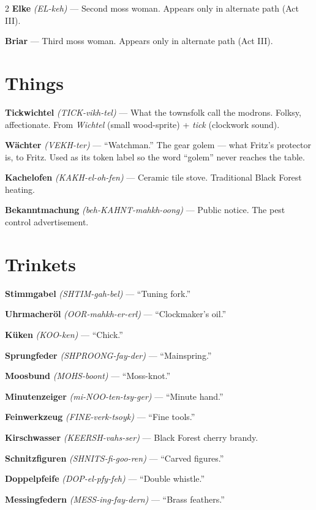 \documentclass[10pt,letterpaper]{article}
\begin{document}
\begin{multicols}{2}
\textbf{Elke} \textit{(EL-keh)} --- Second moss woman. Appears only in alternate path (Act III).

\textbf{Briar} --- Third moss woman. Appears only in alternate path (Act III).

\columnbreak

\section*{Things}

\textbf{Tickwichtel} \textit{(TICK-vikh-tel)} --- What the townsfolk call the modrons. Folksy, affectionate. From \textit{Wichtel} (small wood-sprite) + \textit{tick} (clockwork sound).

\textbf{Wächter} \textit{(VEKH-ter)} --- ``Watchman.'' The gear golem --- what Fritz's protector is, to Fritz. Used as its token label so the word ``golem'' never reaches the table.

\textbf{Kachelofen} \textit{(KAKH-el-oh-fen)} --- Ceramic tile stove. Traditional Black Forest heating.

\textbf{Bekanntmachung} \textit{(beh-KAHNT-mahkh-oong)} --- Public notice. The pest control advertisement.

\section*{Trinkets}

\textbf{Stimmgabel} \textit{(SHTIM-gah-bel)} --- ``Tuning fork.''

\textbf{Uhrmacheröl} \textit{(OOR-mahkh-er-erl)} --- ``Clockmaker's oil.''

\textbf{Küken} \textit{(KOO-ken)} --- ``Chick.''

\textbf{Sprungfeder} \textit{(SHPROONG-fay-der)} --- ``Mainspring.''

\textbf{Moosbund} \textit{(MOHS-boont)} --- ``Moss-knot.''

\textbf{Minutenzeiger} \textit{(mi-NOO-ten-tsy-ger)} --- ``Minute hand.''

\textbf{Feinwerkzeug} \textit{(FINE-verk-tsoyk)} --- ``Fine tools.''

\textbf{Kirschwasser} \textit{(KEERSH-vahs-ser)} --- Black Forest cherry brandy.

\textbf{Schnitzfiguren} \textit{(SHNITS-fi-goo-ren)} --- ``Carved figures.''

\textbf{Doppelpfeife} \textit{(DOP-el-pfy-feh)} --- ``Double whistle.''

\textbf{Messingfedern} \textit{(MESS-ing-fay-dern)} --- ``Brass feathers.''


\end{multicols}
\end{document}
